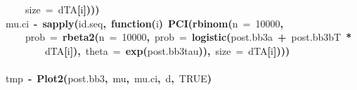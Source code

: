 \documentclass{article}
\makeatletter
\newcommand{\hlnumber}[1]{\textcolor[rgb]{0,0,0}{#1}}%
\newcommand{\hlfunctioncall}[1]{\textcolor[rgb]{.5,0,.33}{\textbf{#1}}}%
\newcommand{\hlkeyword}[1]{\textbf{#1}}%
\newcommand{\hlargument}[1]{\textcolor[rgb]{.69,.25,.02}{#1}}%
\newcommand{\hlformalargs}[1]{\hlargument{#1}}%
\newcommand{\hlassignement}[1]{\textbf{#1}}%
\newcommand{\hlsymbol}[1]{#1}%
\newcommand{\hlstd}[1]{\textcolor[rgb]{0,0,0}{#1}}%
\newenvironment{kframe}{%
 \def\FrameCommand##1{\hskip\@totalleftmargin \hskip-\fboxsep
 \colorbox{shadecolor}{##1}\hskip-\fboxsep
     \hskip-\linewidth \hskip-\@totalleftmargin \hskip\columnwidth}%
 \MakeFramed {\advance\hsize-\width
   \@totalleftmargin\z@ \linewidth\hsize
   \@setminipage}}%
 {\par\unskip\endMakeFramed}
\newenvironment{knitrout}{}{} %
\makeatother
\begin{document}
\begin{knitrout}
{\begin{kframe}
\begin{flushleft}
\hlstd{}{\ }{\ }{\ }{\ }\hlargument{size}{\ }\hlargument{=}{\ }\hlsymbol{d}\hlkeyword{\usebox{\hlnormalsizeboxdollar}}\hlsymbol{TA}\hlkeyword{[}\hlsymbol{i}\hlkeyword{]}\hlkeyword{)}\hlkeyword{)}\hlkeyword{)}\hspace*{\fill}\\
\hlstd{}\hlsymbol{mu.ci}{\ }\hlassignement{\usebox{\hlnormalsizeboxlessthan}-}{\ }\hlfunctioncall{sapply}\hlkeyword{(}\hlsymbol{id.seq}\hlkeyword{,}{\ }\hlkeyword{function}\hlkeyword{(}\hlformalargs{i}\hlkeyword{)}{\ }\hlfunctioncall{PCI}\hlkeyword{(}\hlfunctioncall{rbinom}\hlkeyword{(}\hlargument{n}{\ }\hlargument{=}{\ }\hlnumber{10000}\hlkeyword{,}\hspace*{\fill}\\
\hlstd{}{\ }{\ }{\ }{\ }\hlargument{prob}{\ }\hlargument{=}{\ }\hlfunctioncall{rbeta2}\hlkeyword{(}\hlargument{n}{\ }\hlargument{=}{\ }\hlnumber{10000}\hlkeyword{,}{\ }\hlargument{prob}{\ }\hlargument{=}{\ }\hlfunctioncall{logistic}\hlkeyword{(}\hlsymbol{post.bb3}\hlkeyword{\usebox{\hlnormalsizeboxdollar}}\hlsymbol{a}{\ }\hlkeyword{+}{\ }\hlsymbol{post.bb3}\hlkeyword{\usebox{\hlnormalsizeboxdollar}}\hlsymbol{bT}{\ }\hlkeyword{*}\hspace*{\fill}\\
\hlstd{}{\ }{\ }{\ }{\ }{\ }{\ }{\ }{\ }\hlsymbol{d}\hlkeyword{\usebox{\hlnormalsizeboxdollar}}\hlsymbol{TA}\hlkeyword{[}\hlsymbol{i}\hlkeyword{]}\hlkeyword{)}\hlkeyword{,}{\ }\hlargument{theta}{\ }\hlargument{=}{\ }\hlfunctioncall{exp}\hlkeyword{(}\hlsymbol{post.bb3}\hlkeyword{\usebox{\hlnormalsizeboxdollar}}\hlsymbol{tau}\hlkeyword{)}\hlkeyword{)}\hlkeyword{,}{\ }\hlargument{size}{\ }\hlargument{=}{\ }\hlsymbol{d}\hlkeyword{\usebox{\hlnormalsizeboxdollar}}\hlsymbol{TA}\hlkeyword{[}\hlsymbol{i}\hlkeyword{]}\hlkeyword{)}\hlkeyword{)}\hlkeyword{)}\hspace*{\fill}\\
\hlstd{}\hspace*{\fill}\\
\hlstd{}\hlsymbol{tmp}{\ }\hlassignement{\usebox{\hlnormalsizeboxlessthan}-}{\ }\hlfunctioncall{Plot2}\hlkeyword{(}\hlsymbol{post.bb3}\hlkeyword{,}{\ }\hlsymbol{mu}\hlkeyword{,}{\ }\hlsymbol{mu.ci}\hlkeyword{,}{\ }\hlsymbol{d}\hlkeyword{,}{\ }\hlnumber{TRUE}\hlkeyword{)}\mbox{}
\normalfont
\end{flushleft}

\end{kframe}}
\end{knitrout}
\end{document}
